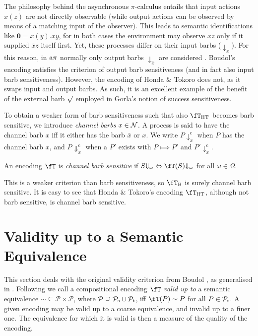 \documentclass[runningheads]{llncs}
\newcommand{\T}{\mathcal{P}}             %
\newcommand{\N} {{\cal N}}               %
\newcommand{\trans}[1]{\fT(#1)}
\newcommand{\nil}{\mathbf{0}}
\newcommand{\ascomm}[1]{\downarrow^{\mathrm{c}}_{#1}}
\newcommand{\acomm}[1]{\Downarrow^{\mathrm{c}}_{#1}}
\begin{document}
The philosophy behind the asynchronous $\pi$-calculus entails that input actions $x(z)$ are not
directly observable (while output actions can be observed by means of a matching input of
the observer). This leads to semantic identifications like $\nil = x(y).\bar xy$, for in
both cases the environment may observe $\bar x z$ only if it supplied $\bar x z$ itself first.
Yet, these processes differ on their input barbs ($\downarrow_x$). For this reason, in
$\rm a\pi$ normally only output barbs ${\downarrow_{\bar x}}$ are considered \cite{SW01book}.
Boudol's encoding satisfies the
criterion of output barb sensitiveness (and in fact also input barb sensitiveness).
However, the encoding of Honda \& Tokoro does not, as it swaps input and output barbs.
As such, it is an excellent example of the benefit of the external barb $\surd$ employed in Gorla's
notion of success sensitiveness.

To obtain a weaker form of barb sensitiveness such that also $\fT_{\rm HT}$ becomes barb sensitive,
we introduce \emph{channel barbs} $x\in\N$. A process is said to have the channel barb $x$ iff it
either has the barb $\bar x$ or $x$. We write $P \!\ascomm x$ when $P$ has the channel barb $x$,
and $P\acomm x$ when a $P'$ exists with $P \Longmapsto P'$ and $P' \!\ascomm x$.

\begin{definition}\rm
  An encoding $\fT$ is \emph{channel barb sensitive} if
  $S{\Downarrow_\omega} \Leftrightarrow \trans{S}{\Downarrow_\omega}$ for all $\omega\in\Omega$.
\end{definition}
This is a weaker criterion than barb sensitiveness, so $\fT_{\rm B}$ is surely channel barb sensitive.
It is easy to see that Honda \& Tokoro's encoding $\fT_{\rm HT}$, although not barb sensitive, is
channel barb sensitive.


\section{Validity up to a Semantic Equivalence}\label{sec:validity upto}

This section deals with the original validity criterion from Boudol \cite{Bo85}, as generalised in \cite{vG12}.
Following \cite{vG12} we call a compositional encoding $\fT$ \emph{valid up to} a semantic equivalence
${\sim} \subseteq \T \times \T$, where $\T\supseteq \T_{\rm s} \cup \T_{\rm t}$, iff $\trans{P} \sim P$ for all $P\in\T_{\rm s}$.
A given encoding may be valid up to a coarse equivalence, and invalid up to a finer one.
The equivalence for which it is valid is then a measure of the quality of the encoding.
\end{document}
